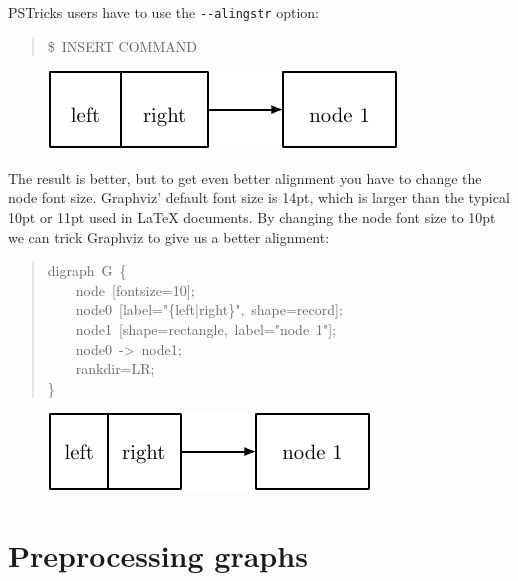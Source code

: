\documentclass[10pt,a4paper,english]{article}
\begin{document}
PSTricks users have to use the \texttt{-{}-alingstr} option:
\begin{quote}{\ttfamily \raggedright \noindent
{\$}~INSERT COMMAND
}\end{quote}
\begin{figure}[H]
\centering

\includegraphics{pdf/valignmode2}
\end{figure}

The result is better, but to get even better alignment you have to change the node font size. Graphviz' default font size is 14pt, which is larger than the typical 10pt or 11pt used in LaTeX documents. By changing the node font size to 10pt we can trick Graphviz to give us a better alignment:
\begin{quote}{\ttfamily \raggedright \noindent
digraph~G~{\{}~\\
~~~~node~{[}fontsize=10{]};~\\
~~~~node0~{[}label="{\{}left|right{\}}",~shape=record{]};~\\
~~~~node1~{[}shape=rectangle,~label="node~1"{]};~\\
~~~~node0~->~node1;~\\
~~~~rankdir=LR;~\\
{\}}
}\end{quote}
\begin{figure}[H]
\centering

\includegraphics{pdf/valignmode3}
\end{figure}



\hypertarget{preprocessing-graphs}{}
\section*{Preprocessing graphs}
\label{preprocessing-graphs}
\end{document}
